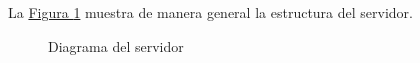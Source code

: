 La \hyperref[\detokenize{chapter_two/desc_cloudnao:cn-server-lar-diagram}]{Figura \ref{\detokenize{chapter_two/desc_cloudnao:cn-server-lar-diagram}}} muestra de manera general la estructura del
servidor.

\begin{figure}[htbp]
\centering
\capstart

\noindent{}
\caption{Diagrama del servidor}\label{\detokenize{chapter_two/desc_cloudnao:cn-server-lar-diagram}}\end{figure}
